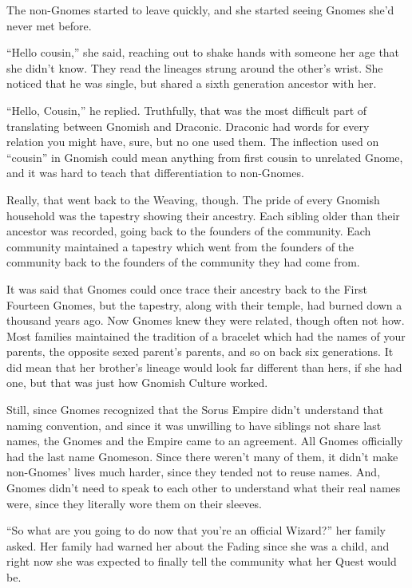 \documentclass[12pt]{article}[titlepage]
\newcommand{\say}[1]{``#1''}
\renewcommand{\,}{\textsuperscript{,}}
\begin{document}
The non-Gnomes started to leave quickly, and she started seeing Gnomes she'd never met before.

\say{Hello cousin,} she said, reaching out to shake hands with someone her age that she didn't know.
They read the lineages strung around the other's wrist.
She noticed that he was single, but shared a sixth generation ancestor with her.

\say{Hello, Cousin,} he replied.
Truthfully, that was the most difficult part of translating between Gnomish and Draconic.
Draconic had words for every relation you might have, sure, but no one used them.
The inflection used on \say{cousin} in Gnomish could mean anything from first cousin to unrelated Gnome, and it was hard to teach that differentiation to non-Gnomes.

Really, that went back to the Weaving, though.
The pride of every Gnomish household was the tapestry showing their ancestry.
Each sibling older than their ancestor was recorded, going back to the founders of the community.
Each community maintained a tapestry which went from the founders of the community back to the founders of the community they had come from.

It was said that Gnomes could once trace their ancestry back to the First Fourteen Gnomes, but the tapestry, along with their temple, had burned down a thousand years ago.
Now Gnomes knew they were related, though often not how.
Most families maintained the tradition of a bracelet which had the names of your parents, the opposite sexed parent's parents, and so on back six generations.
It did mean that her brother's lineage would look far different than hers, if she had one, but that was just how Gnomish Culture worked.

Still, since Gnomes recognized that the Sorus Empire didn't understand that naming convention, and since it was unwilling to have siblings not share last names, the Gnomes and the Empire came to an agreement.
All Gnomes officially had the last name Gnomeson.
Since there weren't many of them, it didn't make non-Gnomes' lives much harder, since they tended not to reuse names.
And, Gnomes didn't need to speak to each other to understand what their real names were, since they literally wore them on their sleeves.

\say{So what are you going to do now that you're an official Wizard?} her family asked.
Her family had warned her about the Fading since she was a child, and right now she was expected to finally tell the community what her Quest would be.
\end{document}
